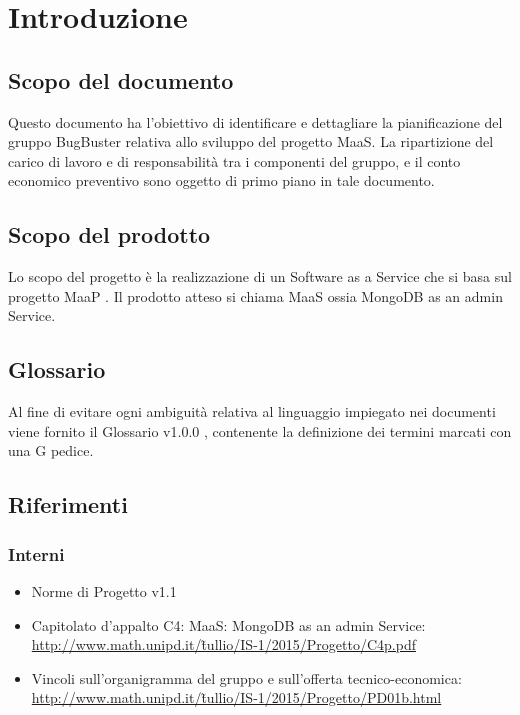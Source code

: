 \section{Introduzione}
\subsection{Scopo del documento}
Questo documento ha l’obiettivo di identificare e dettagliare la pianificazione del gruppo BugBuster
relativa allo sviluppo del progetto MaaS. La ripartizione del carico di lavoro e di responsabilità tra i
componenti del gruppo, e il conto economico preventivo sono oggetto di primo piano in tale documento.

\subsection{Scopo del prodotto}
Lo scopo del progetto è la realizzazione di un Software as a Service che si basa sul progetto MaaP . Il prodotto atteso si chiama MaaS ossia MongoDB as an admin Service.

\subsection{Glossario}
Al fine di evitare ogni ambiguità relativa al linguaggio impiegato nei documenti viene fornito il Glossario
v1.0.0 , contenente la definizione dei termini marcati con una G pedice.

\subsection{Riferimenti}
\subsubsection{Interni}
\begin{itemize}
\item Norme di Progetto v1.1
\item Capitolato d'appalto C4: MaaS: MongoDB as an admin Service: \\ \href{http://www.math.unipd.it/~tullio/IS-1/2015/Progetto/C4p.pdf}{http://www.math.unipd.it/\~tullio/IS-1/2015/Progetto/C4p.pdf} 
\item Vincoli sull’organigramma del gruppo e sull’offerta tecnico-economica: \\
\href{http://www.math.unipd.it/~tullio/IS-1/2015/Progetto/PD01b.html}{http://www.math.unipd.it/\~tullio/IS-1/2015/Progetto/PD01b.html}
\end{itemize}
